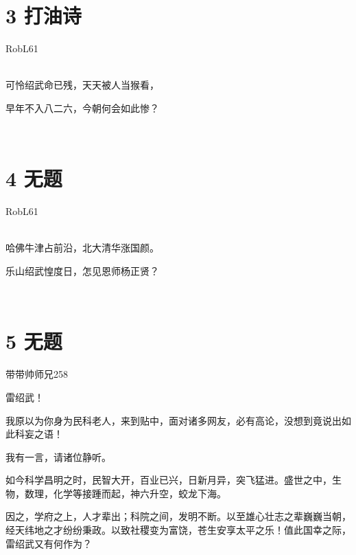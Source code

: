 \documentclass[UTF8,12pt,oneside]{ctexbook}
\begin{document}
    \section{3 打油诗}
    \begin{center}
        RobL61
        
        ~\\
        可怜绍武命已残，天天被人当猴看，
        
        早年不入八二六，今朝何会如此惨？
        
        ~\\

    \end{center}
    
    \section{4 无题}
    \begin{center}
        RobL61
        
        ~\\
        哈佛牛津占前沿，北大清华涨国颜。
        
        乐山绍武惶度日，怎见恩师杨正贤？
        
        ~\\

    \end{center}
    
    \newpage
    
    \section{5 无题}
        \begin{center}
            带带帅师兄258
            
        \end{center}
        
        雷绍武！
        
        我原以为你身为民科老人，来到贴中，面对诸多网友，必有高论，没想到竟说出如此科妄之语！
        
        我有一言，请诸位静听。
        
        如今科学昌明之时，民智大开，百业已兴，日新月异，突飞猛进。盛世之中，生物，数理，化学等接踵而起，神六升空，蛟龙下海。
        
        因之，学府之上，人才辈出；科院之间，发明不断。以至雄心壮志之辈巍巍当朝，经天纬地之才纷纷秉政。以致社稷变为富饶，苍生安享太平之乐！值此国幸之际，雷绍武又有何作为？
        
\end{document}
